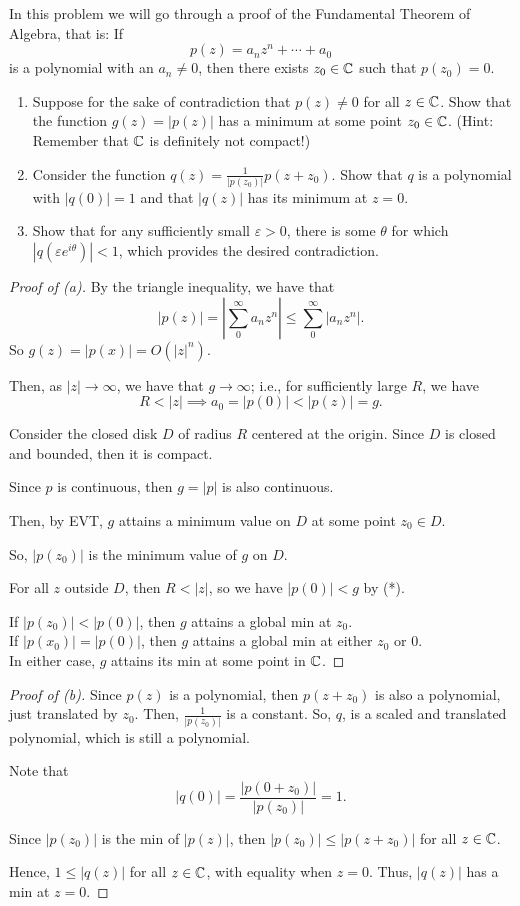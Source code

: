 \documentclass[../hw1]{subfiles}
\begin{document}
\let\epsilon\varepsilon
\begin{problem}
In this problem we will go through a proof of the Fundamental Theorem of Algebra,
that is: If \[
	p(z)=a_n z^n + \cdots + a_0
\] is a polynomial with an $a_n\neq 0$, then there exists $z_0\in \mathbb{C}$ such that $p(z_0)=0$.
\begin{enumerate}[label=(\roman*)]
	\item Suppose for the sake of contradiction that $p(z) \neq 0$ for all $z \in \mathbb{C}$. Show that the function $g(z) = |p(z)|$ has a minimum at some point $z_0\in \mathbb{C}$. (Hint: Remember that $\mathbb{C}$ is definitely not compact!)
	\item Consider the function $q(z)=\frac{1}{|p(z_0)|}p(z+z_0)$.
	      Show that $q$ is a polynomial with $|q(0)| = 1$ and that $|q(z)|$ has its minimum at $z = 0$.
	\item Show that for any sufficiently small $\epsilon>0$, there is some $\theta$ for which $|q(\epsilon e^{i\theta})|<1$, which provides the desired contradiction.
\end{enumerate}
\end{problem}
\begin{proof}[Proof of (a)]
	By the triangle inequality, we have that \[
		|p(z)| = \left| \sum_{0}^{\infty} a_n z^n \right| \le \sum_{0}^{\infty} | a_n z^n |
		.\]
	So $g(z)=|p(x)| = O(|z|^n)$.

	Then, as $|z|\to \infty$, we have that $g\to \infty$;
	i.e., for sufficiently large $R$, we have \[
		R < |z| \implies a_0=|p(0)| < |p(z)| = g \tag{*}
		.\]

	Consider the closed disk $D$ of radius $R$ centered at the origin.
	Since $D$ is closed and bounded, then it is compact.

	Since $p$ is continuous, then $g=|p|$ is also continuous.

	Then, by EVT, $g$ attains a minimum value on $D$ at some point  $z_0\in D$.

	So, $|p(z_0)|$ is the minimum value of $g$ on  $D$.

	For all $z$ outside $D$, then $R < |z|$, so we have $|p(0)| < g$ by (*).

	If $|p(z_0)| < |p(0)|$, then $g$ attains a global min at $z_0$.\\
	If $|p(x_0)| = |p(0)|$, then $g$ attains a global min at either $z_0$ or 0.\\
	In either case, $g$ attains its min at some point in $\mathbb{C}$.
\end{proof}
\begin{proof}[Proof of (b)]
	Since $p(z)$ is a polynomial, then  $p(z+z_0)$ is also a polynomial, just translated by $z_0$.
	Then, $\frac{1}{|p(z_0)|}$ is a constant.
	So, $q$, is a scaled and translated polynomial, which is still a polynomial.

	Note that  \[
		|q(0)|=\frac{|p(0+z_0)|}{|p(z_0)|}=1
		.\]

	Since $|p(z_0)|$ is the min of $|p(z)|$, then  $|p(z_0)|\le |p(z+z_0)|$ for all $z\in \mathbb{C}$.

	Hence, $1\le |q(z)|$ for all $z\in \mathbb{C}$, with equality when $z=0$.
	Thus, $|q(z)|$ has a min at $z=0$.
\end{proof}
\end{document}
